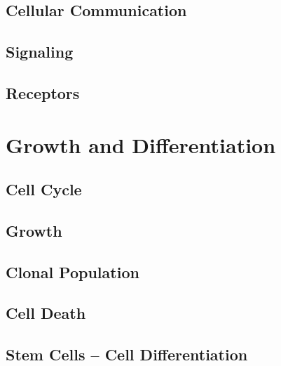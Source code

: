 \documentclass[12pt]{cheatsheet}
\begin{document}
\subsection*{Cellular Communication}

\subsection*{Signaling}

\subsection*{Receptors}

\vfill \null \columnbreak


\section*{Growth and Differentiation}
\subsection*{Cell Cycle}

\subsection*{Growth}

\subsection*{Clonal Population}

\subsection*{Cell Death}

\subsection*{Stem Cells – Cell Differentiation}







\end{document}
